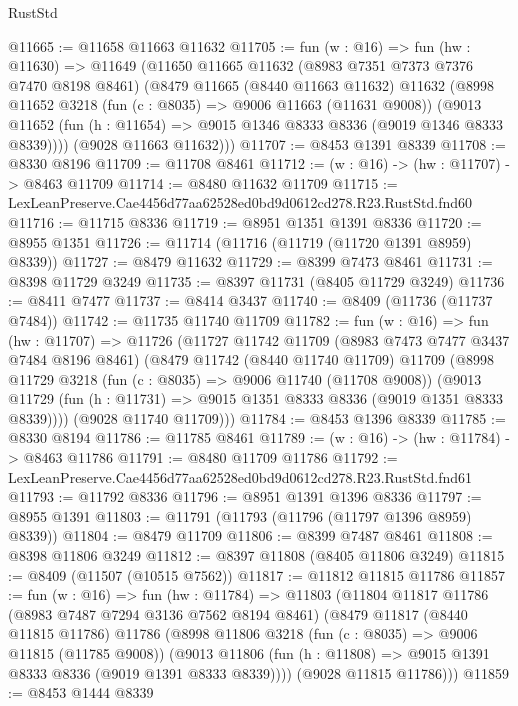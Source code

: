 \begin{lexlean}{RustStd}
\begin{coremodule}
@11665 := @11658 @11663 @11632
@11705 := fun (w : @16) =>
  fun (hw : @11630) =>
  @11649
    (@11650
      @11665
      @11632
      (@8983 @7351 @7373 @7376 @7470 @8198 @8461)
      (@8479
        @11665
        (@8440 @11663 @11632)
        @11632
        (@8998
          @11652
          @3218
          (fun (c : @8035) => @9006 @11663 (@11631 @9008))
          (@9013 @11652 (fun (h : @11654) => @9015 @1346 @8333 @8336 (@9019 @1346 @8333 @8339))))
        (@9028 @11663 @11632)))
@11707 := @8453 @1391 @8339
@11708 := @8330 @8196
@11709 := @11708 @8461
@11712 := (w : @16) -> (hw : @11707) -> @8463 @11709
@11714 := @8480 @11632 @11709
@11715 := LexLeanPreserve.Cae4456d77aa62528ed0bd9d0612cd278.R23.RustStd.fnd60
@11716 := @11715 @8336
@11719 := @8951 @1351 @1391 @8336
@11720 := @8955 @1351
@11726 := @11714 (@11716 (@11719 (@11720 @1391 @8959) @8339))
@11727 := @8479 @11632
@11729 := @8399 @7473 @8461
@11731 := @8398 @11729 @3249
@11735 := @8397 @11731 (@8405 @11729 @3249)
@11736 := @8411 @7477
@11737 := @8414 @3437
@11740 := @8409 (@11736 (@11737 @7484))
@11742 := @11735 @11740 @11709
@11782 := fun (w : @16) =>
  fun (hw : @11707) =>
  @11726
    (@11727
      @11742
      @11709
      (@8983 @7473 @7477 @3437 @7484 @8196 @8461)
      (@8479
        @11742
        (@8440 @11740 @11709)
        @11709
        (@8998
          @11729
          @3218
          (fun (c : @8035) => @9006 @11740 (@11708 @9008))
          (@9013 @11729 (fun (h : @11731) => @9015 @1351 @8333 @8336 (@9019 @1351 @8333 @8339))))
        (@9028 @11740 @11709)))
@11784 := @8453 @1396 @8339
@11785 := @8330 @8194
@11786 := @11785 @8461
@11789 := (w : @16) -> (hw : @11784) -> @8463 @11786
@11791 := @8480 @11709 @11786
@11792 := LexLeanPreserve.Cae4456d77aa62528ed0bd9d0612cd278.R23.RustStd.fnd61
@11793 := @11792 @8336
@11796 := @8951 @1391 @1396 @8336
@11797 := @8955 @1391
@11803 := @11791 (@11793 (@11796 (@11797 @1396 @8959) @8339))
@11804 := @8479 @11709
@11806 := @8399 @7487 @8461
@11808 := @8398 @11806 @3249
@11812 := @8397 @11808 (@8405 @11806 @3249)
@11815 := @8409 (@11507 (@10515 @7562))
@11817 := @11812 @11815 @11786
@11857 := fun (w : @16) =>
  fun (hw : @11784) =>
  @11803
    (@11804
      @11817
      @11786
      (@8983 @7487 @7294 @3136 @7562 @8194 @8461)
      (@8479
        @11817
        (@8440 @11815 @11786)
        @11786
        (@8998
          @11806
          @3218
          (fun (c : @8035) => @9006 @11815 (@11785 @9008))
          (@9013 @11806 (fun (h : @11808) => @9015 @1391 @8333 @8336 (@9019 @1391 @8333 @8339))))
        (@9028 @11815 @11786)))
@11859 := @8453 @1444 @8339

\end{coremodule}
\end{lexlean}
